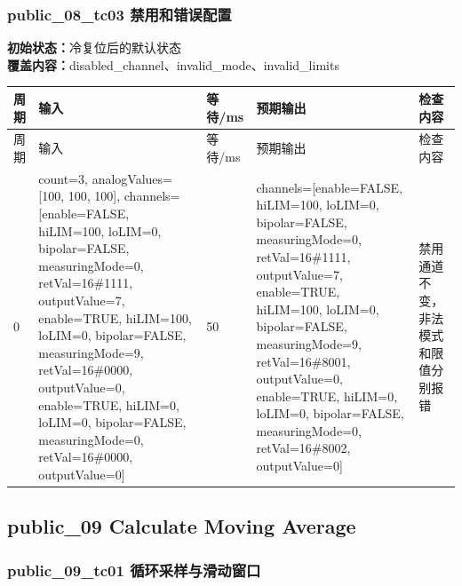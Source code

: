 \subsubsection{{\ttfamily public\_08\_tc03} 禁用和错误配置}

\noindent\textbf{初始状态：}冷复位后的默认状态\\

\textbf{覆盖内容：}disabled\_channel、invalid\_mode、invalid\_limits

\begin{longtable}{L{1.0cm}L{4.7cm}L{1.4cm}L{4.0cm}L{2.1cm}}

\toprule

周期 & 输入 & 等待/ms & 预期输出 & 检查内容\\

\midrule

\endfirsthead

\toprule

周期 & 输入 & 等待/ms & 预期输出 & 检查内容\\

\midrule

\endhead

0 & count=3, analogValues=[100, 100, 100], channels=[enable=FALSE, hiLIM=100, loLIM=0, bipolar=FALSE, measuringMode=0, retVal=16\#1111, outputValue=7, enable=TRUE, hiLIM=100, loLIM=0, bipolar=FALSE, measuringMode=9, retVal=16\#0000, outputValue=0, enable=TRUE, hiLIM=0, loLIM=0, bipolar=FALSE, measuringMode=0, retVal=16\#0000, outputValue=0] & 50 & channels=[enable=FALSE, hiLIM=100, loLIM=0, bipolar=FALSE, measuringMode=0, retVal=16\#1111, outputValue=7, enable=TRUE, hiLIM=100, loLIM=0, bipolar=FALSE, measuringMode=9, retVal=16\#8001, outputValue=0, enable=TRUE, hiLIM=0, loLIM=0, bipolar=FALSE, measuringMode=0, retVal=16\#8002, outputValue=0] & 禁用通道不变，非法模式和限值分别报错\\

\bottomrule

\end{longtable}

\subsection{{\ttfamily public\_09} Calculate Moving Average}

\subsubsection{{\ttfamily public\_09\_tc01} 循环采样与滑动窗口}

